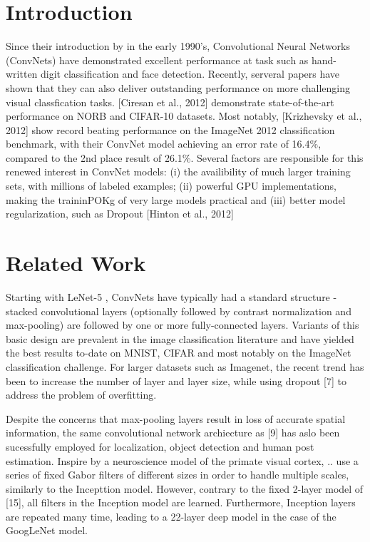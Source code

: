 \documentclass{sig-alternate}
\begin{document}


\section{Introduction}

Since their introduction by in the early 1990's, Convolutional Neural Networks (ConvNets) have demonstrated excellent performance at task such as hand-written digit classification and face detection. Recently, serveral papers have shown that they can also deliver outstanding performance on more challenging visual classfication tasks. [Ciresan et al., 2012] demonstrate state-of-the-art performance on NORB and CIFAR-10 datasets. Most notably, [Krizhevsky et al., 2012] show record beating performance on the ImageNet 2012 classification benchmark, with their ConvNet model achieving an error rate of 16.4\%, compared to the 2nd place result of 26.1\%. Several factors are responsible for this renewed interest in ConvNet models: (i) the availibility of much larger training sets, with millions of labeled examples; (ii) powerful GPU implementations, making the traininPOKg of very large models practical and (iii) better model regularization, such as Dropout [Hinton et al., 2012]


\section{Related Work}
Starting with LeNet-5 \citep{NIPS1989_293}, ConvNets have typically had a standard structure - stacked convolutional layers (optionally followed by contrast normalization and max-pooling) are followed by one or more fully-connected layers. Variants of this basic design are prevalent in the image classification literature and have yielded the best results to-date on MNIST, CIFAR and most notably on the ImageNet classification challenge. For larger datasets such as Imagenet, the recent trend has been to increase the number of layer and layer size, while using dropout [7] to address the problem of overfitting.

Despite the concerns that max-pooling layers result in loss of accurate spatial information, the same convolutional network archiecture as [9] has aslo been sucessfully employed for localization, object detection and human post estimation. Inspire by a neuroscience model of the primate visual cortex, .. use a series of fixed Gabor filters of different sizes in order to handle multiple scales, similarly to the Incepttion model. However, contrary to the fixed 2-layer model of [15], all filters in the Inception model are learned. Furthermore, Inception layers are repeated many time, leading to a 22-layer deep model in the case of the GoogLeNet model.
\end{document}
